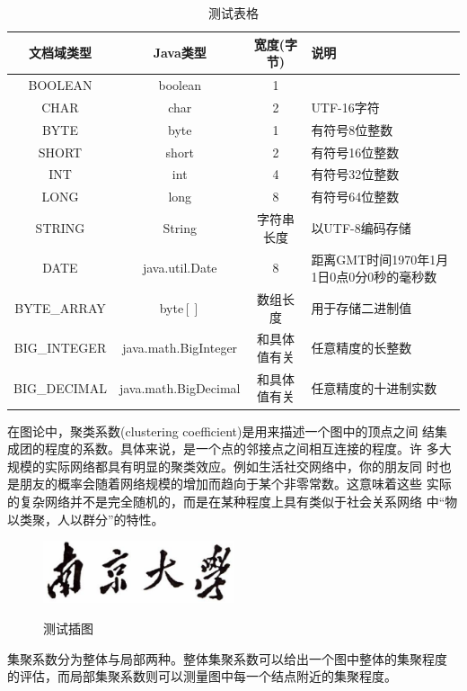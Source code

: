\documentclass[oneside, phd]{njuthesis}
\begin{document}
\begin{table}
  \centering
  \begin{tabular}{cccp{38mm}}
    \toprule
    \textbf{文档域类型} & \textbf{Java类型} & \textbf{宽度(字节)} & \textbf{说明} \\
    \midrule
    BOOLEAN  & boolean &  1  & \\
    CHAR     & char    &  2  & UTF-16字符 \\
    BYTE     & byte    &  1  & 有符号8位整数 \\
    SHORT    & short   &  2  & 有符号16位整数 \\
    INT      & int     &  4  & 有符号32位整数 \\
    LONG     & long    &  8  & 有符号64位整数 \\
    STRING   & String  &  字符串长度  & 以UTF-8编码存储 \\
    DATE     & java.util.Date & 8 & 距离GMT时间1970年1月1日0点0分0秒的毫秒数 \\
    BYTE\_ARRAY & byte$[]$ & 数组长度 & 用于存储二进制值 \\
    BIG\_INTEGER & java.math.BigInteger & 和具体值有关 & 任意精度的长整数 \\
    BIG\_DECIMAL & java.math.BigDecimal & 和具体值有关 & 任意精度的十进制实数 \\
    \bottomrule
  \end{tabular}
  \caption{测试表格}\label{table:test3}
\end{table}

在图论中，聚类系数(clustering coefficient)是用来描述一个图中的顶点之间
结集成团的程度的系数。具体来说，是一个点的邻接点之间相互连接的程度。许
多大规模的实际网络都具有明显的聚类效应。例如生活社交网络中，你的朋友同
时也是朋友的概率会随着网络规模的增加而趋向于某个非零常数。这意味着这些
实际的复杂网络并不是完全随机的，而是在某种程度上具有类似于社会关系网络
中“物以类聚，人以群分”的特性。

\begin{figure}[htbp]
  \centering
  \includegraphics[width= 0.5\textwidth]{njuname.eps}\\
  \caption{测试插图}\label{fig:test4}
\end{figure}

集聚系数分为整体与局部两种。整体集聚系数可以给出一个图中整体的集聚程度
的评估，而局部集聚系数则可以测量图中每一个结点附近的集聚程度。
\end{document}
